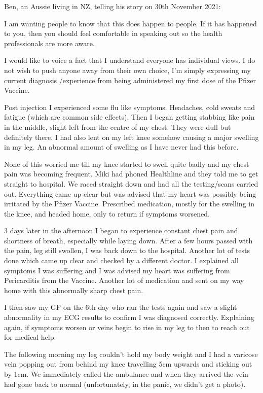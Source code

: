 Ben, an Aussie living in NZ, telling his story on 30th November 2021:

I am wanting people to know that this does happen to people. If it has happened
to you, then you should feel comfortable in speaking out so the health
professionals are more aware.

I would like to voice a fact that I understand everyone has individual views. I
do not wish to push anyone away from their own choice, I’m simply expressing my
current diagnosis /experience from being administered my first dose of the
Pfizer Vaccine.

Post injection I experienced some flu like symptoms. Headaches, cold sweats and
fatigue (which are common side effects). Then I began getting stabbing like pain
in the middle, slight left from the centre of my chest. They were dull but
definitely there. I had also lent on my left knee somehow causing a major
swelling in my leg. An abnormal amount of swelling as I have never had this
before.

None of this worried me till my knee started to swell quite badly and my chest
pain was becoming frequent. Miki had phoned Healthline and they told me to get
straight to hospital. We raced straight down and had all the testing/scans
carried out. Everything came up clear but was advised that my heart was possibly
being irritated by the Pfizer Vaccine. Prescribed medication, mostly for the
swelling in the knee, and headed home, only to return if symptoms worsened.

3 days later in the afternoon I began to experience constant chest pain and
shortness of breath, especially while laying down. After a few hours passed with
the pain, leg still swollen, I was back down to the hospital. Another lot of
tests done which came up clear and checked by a different doctor. I explained
all symptoms I was suffering and I was advised my heart was suffering from
Pericarditis from the Vaccine. Another lot of medication and sent on my way home
with this abnormally sharp chest pain.

I then saw my GP on the 6th day who ran the tests again and saw a slight
abnormality in my ECG results to confirm I was diagnosed correctly. Explaining
again, if symptoms worsen or veins begin to rise in my leg to then to reach out
for medical help.

The following morning my leg couldn’t hold my body weight and I had a varicose
vein popping out from behind my knee travelling 5cm upwards and sticking out by
1cm. We immediately called the ambulance and when they arrived the vein had gone
back to normal (unfortunately, in the panic, we didn’t get a photo).

